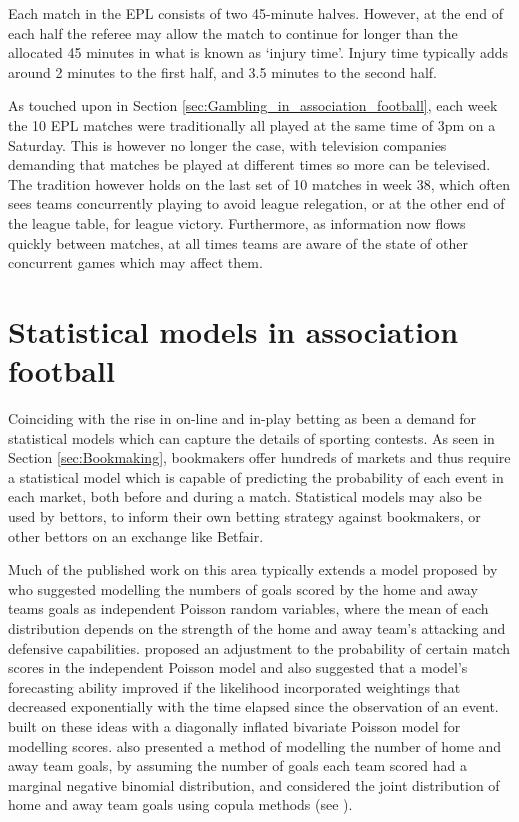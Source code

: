 Each match in the \gls{EPL} consists of two 45-minute halves. However, at the end of each half the referee may allow
the match to continue for longer than the allocated 45 minutes in what is known as `injury time'. Injury time typically
adds around 2 minutes to the first half, and 3.5 minutes to the second half.

As touched upon in Section \ref{sec:Gambling_in_association_football}, each week the 10 \gls{EPL} matches were
traditionally all played at the same time of 3pm on a Saturday. This is however no longer the case, with television
companies demanding that matches be played at different times so more can be televised. The tradition however holds on
the last set of 10 matches in week 38, which often sees teams concurrently playing to avoid league relegation, or at the
other end of the league table, for league victory. Furthermore, as information now flows quickly between matches, at
all times teams are aware of the state of other concurrent games which may affect them.

\section{Statistical models in association football}
\label{sec:Statistical_models_in_association_football}

Coinciding with the rise in on-line and in-play betting as been a demand for statistical models which can capture the
details of sporting contests. As seen in Section \ref{sec:Bookmaking}, bookmakers offer hundreds of markets and thus
require a statistical model which is capable of predicting the probability of each event in each market, both before and
during a match. Statistical models may also be used by bettors, to inform their own betting strategy against bookmakers,
or other bettors on an exchange like Betfair.

Much of the published work on this area typically extends a model proposed by \cite{Maher1982} who suggested modelling
the numbers of goals scored by the home and away teams goals as independent Poisson random variables, where the mean of
each distribution depends on the strength of the home and away team's attacking and defensive capabilities.
\cite{DixonColes1997} proposed an adjustment to the probability of certain match scores in the independent Poisson model
and also suggested that a model's forecasting ability improved if the likelihood incorporated weightings that decreased
exponentially with the time elapsed since the observation of an event. \cite{KarlisNtzoufras2003} built on these ideas
with a diagonally inflated bivariate Poisson model for modelling scores. \cite{mchale2011} also presented a method of
modelling the number of home and away team goals, by assuming the number of goals each team scored had a marginal
negative binomial distribution, and considered the joint distribution of home and away team goals using copula methods
(see \cite{nelsen2007}).

